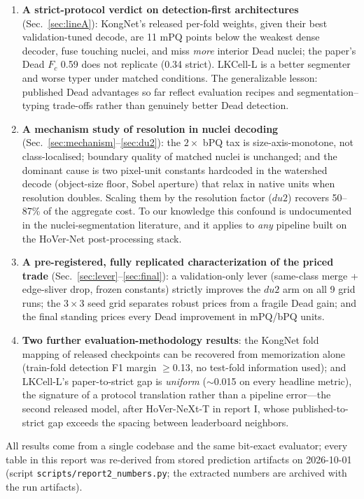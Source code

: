 \documentclass[11pt]{article}
\begin{document}
\begin{enumerate}
\item \textbf{A strict-protocol verdict on detection-first architectures} (Sec.~\ref{sec:lineA}):
KongNet's released per-fold weights, given their best validation-tuned decode, are 11 mPQ
points below the weakest dense decoder, fuse touching nuclei, and miss \emph{more} interior
Dead nuclei; the paper's Dead $F_c$ 0.59 does not replicate (0.34 strict). LKCell-L is a
better segmenter and worse typer under matched conditions. The generalizable lesson:
published Dead advantages so far reflect evaluation recipes and segmentation--typing
trade-offs rather than genuinely better Dead detection.
\item \textbf{A mechanism study of resolution in nuclei decoding}
(Sec.~\ref{sec:mechanism}--\ref{sec:du2}): the $2\times$ bPQ tax is size-axis-monotone,
not class-localised; boundary quality of matched nuclei is unchanged; and the dominant cause
is two pixel-unit constants hardcoded in the watershed decode (object-size floor, Sobel
aperture) that relax in native units when resolution doubles. Scaling them by the resolution
factor ($du2$) recovers 50--87\% of the aggregate cost. To our knowledge this confound is
undocumented in the nuclei-segmentation literature, and it applies to \emph{any} pipeline
built on the HoVer-Net post-processing stack.
\item \textbf{A pre-registered, fully replicated characterization of the priced trade}
(Sec.~\ref{sec:lever}--\ref{sec:final}): a validation-only lever (same-class
merge + edge-sliver drop, frozen constants) strictly improves the $du2$ arm on all 9
grid runs; the $3{\times}3$ seed grid separates robust prices from a fragile Dead gain; and
the final standing prices every Dead improvement in mPQ/bPQ units.
\item \textbf{Two further evaluation-methodology results}: the KongNet fold mapping of
released checkpoints can be recovered from memorization alone (train-fold detection F1 margin
$\geq$0.13, no test-fold information used); and LKCell-L's paper-to-strict gap is
\emph{uniform} ($\sim$0.015 on every headline metric), the signature of a protocol
translation rather than a pipeline error---the second released model, after HoVer-NeXt-T in
report I, whose published-to-strict gap exceeds the spacing between leaderboard neighbors.
\end{enumerate}

All results come from a single codebase and the same bit-exact evaluator; every table in
this report was re-derived from stored prediction artifacts on 2026-10-01
(script \texttt{scripts/report2\_numbers.py}; the extracted numbers are archived with the
run artifacts).
\end{document}
